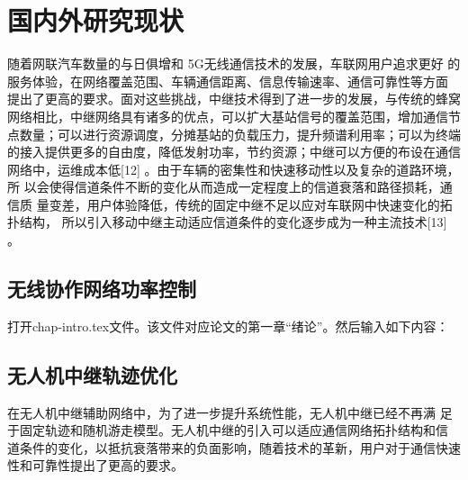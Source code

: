 \section{国内外研究现状}\label{section1-2}
\textcolor[RGB]{202,12,22}{随着网联汽车数量的与日俱增和 5G无线通信技术的发展，车联网用户追求更好
的服务体验，在网络覆盖范围、车辆通信距离、信息传输速率、通信可靠性等方面
提出了更高的要求。面对这些挑战，中继技术得到了进一步的发展，与传统的蜂窝
网络相比，中继网络具有诸多的优点，可以扩大基站信号的覆盖范围，增加通信节
点数量；可以进行资源调度，分摊基站的负载压力，提升频谱利用率；可以为终端
的接入提供更多的自由度，降低发射功率，节约资源；中继可以方便的布设在通信
网络中，运维成本低[12]
。由于车辆的密集性和快速移动性以及复杂的道路环境，所
以会使得信道条件不断的变化从而造成一定程度上的信道衰落和路径损耗，通信质
量变差，用户体验降低，传统的固定中继不足以应对车联网中快速变化的拓扑结构，
所以引入移动中继主动适应信道条件的变化逐步成为一种主流技术[13]
。}
\subsection{无线协作网络功率控制}\label{section1-2-1}
打开chap-intro.tex文件。该文件对应论文的第一章“绪论”。然后输入如下内容：
\subsection{无人机中继轨迹优化}\label{section1-2-2}
\textcolor[RGB]{202,12,22}{在无人机中继辅助网络中，为了进一步提升系统性能，无人机中继已经不再满
足于固定轨迹和随机游走模型。无人机中继的引入可以适应通信网络拓扑结构和信
道条件的变化，以抵抗衰落带来的负面影响，随着技术的革新，用户对于通信快速
性和可靠性提出了更高的要求。}
